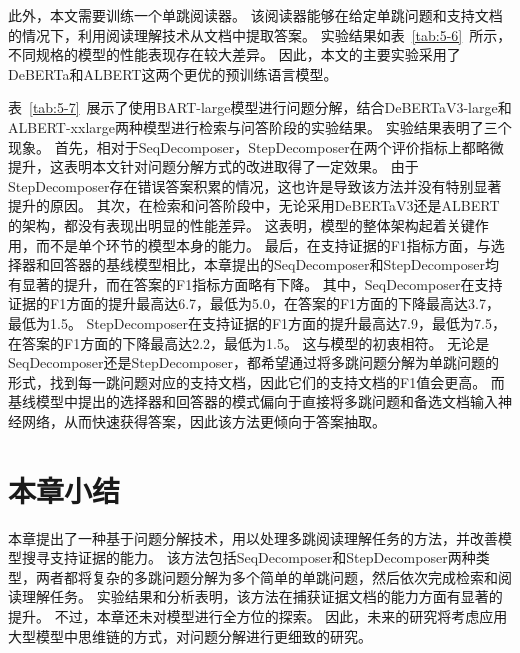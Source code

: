 


此外，本文需要训练一个单跳阅读器。
该阅读器能够在给定单跳问题和支持文档的情况下，利用阅读理解技术从文档中提取答案。
实验结果如表~\ref{tab:5-6}~所示，不同规格的模型的性能表现存在较大差异。
因此，本文的主要实验采用了DeBERTa和ALBERT这两个更优的预训练语言模型。




表~\ref{tab:5-7}~展示了使用BART-large模型进行问题分解，结合DeBERTaV3-large和ALBERT-xxlarge两种模型进行检索与问答阶段的实验结果。
实验结果表明了三个现象。
首先，相对于SeqDecomposer，StepDecomposer在两个评价指标上都略微提升，这表明本文针对问题分解方式的改进取得了一定效果。
由于StepDecomposer存在错误答案积累的情况，这也许是导致该方法并没有特别显著提升的原因。
其次，在检索和问答阶段中，无论采用DeBERTaV3还是ALBERT的架构，都没有表现出明显的性能差异。
这表明，模型的整体架构起着关键作用，而不是单个环节的模型本身的能力。
最后，在支持证据的F1指标方面，与选择器和回答器的基线模型相比，本章提出的SeqDecomposer和StepDecomposer均有显著的提升，而在答案的F1指标方面略有下降。
其中，SeqDecomposer在支持证据的F1方面的提升最高达6.7，最低为5.0，在答案的F1方面的下降最高达3.7，最低为1.5。
StepDecomposer在支持证据的F1方面的提升最高达7.9，最低为7.5，在答案的F1方面的下降最高达2.2，最低为1.5。
这与模型的初衷相符。
无论是SeqDecomposer还是StepDecomposer，都希望通过将多跳问题分解为单跳问题的形式，找到每一跳问题对应的支持文档，因此它们的支持文档的F1值会更高。
而基线模型中提出的选择器和回答器的模式偏向于直接将多跳问题和备选文档输入神经网络，从而快速获得答案，因此该方法更倾向于答案抽取。





\section{本章小结}

本章提出了一种基于问题分解技术，用以处理多跳阅读理解任务的方法，并改善模型搜寻支持证据的能力。
该方法包括SeqDecomposer和StepDecomposer两种类型，两者都将复杂的多跳问题分解为多个简单的单跳问题，然后依次完成检索和阅读理解任务。
实验结果和分析表明，该方法在捕获证据文档的能力方面有显著的提升。
不过，本章还未对模型进行全方位的探索。
因此，未来的研究将考虑应用大型模型中思维链的方式，对问题分解进行更细致的研究。


